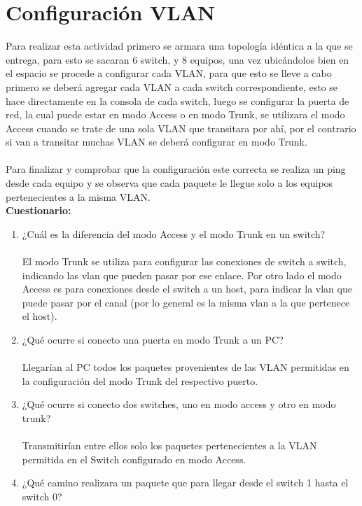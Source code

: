 \documentclass{udpreport}
\begin{document}
	\section{Configuración VLAN}
	    Para realizar esta actividad primero se armara una topología idéntica a la que se entrega, para esto se sacaran 6 switch, y 8 equipos, una vez ubicándolos bien en el espacio se procede a configurar cada VLAN, para que esto se lleve a cabo primero se deberá agregar cada VLAN a cada switch correspondiente, esto se hace directamente en la consola de cada switch, luego se configurar la puerta de red, la cual puede estar en modo Access o en modo Trunk, se utilizara el modo Access cuando se trate de una sola VLAN que transitara por ahí, por el contrario si van a transitar muchas VLAN se deberá configurar en modo Trunk.\\\\
    Para finalizar y comprobar que la configuración este correcta se realiza un ping desde cada equipo y se observa que cada
	paquete le llegue solo a los equipos pertenecientes a la misma VLAN.\\
	
	{\large \bf{Cuestionario: }}\\
	\begin{enumerate}
	    \item ¿Cuál es la diferencia del modo Access y el modo Trunk en un switch?\\\\
	         El modo Trunk se utiliza para configurar las conexiones de switch a switch, indicando las vlan que pueden pasar por ese enlace. Por otro lado el modo Access es para conexiones desde el switch a un host, para indicar la vlan que puede pasar por el canal (por lo general es la misma vlan a la que pertenece el host).
        \item  ¿Qué ocurre si conecto una puerta en modo Trunk a un PC?\\\\
            Llegarían al PC todos los paquetes provenientes de las VLAN permitidas en la configuración del modo Trunk del respectivo puerto.
        \item ¿Qué ocurre si conecto dos switches, uno en modo access y otro en modo trunk?\\\\
              Transmitirían entre ellos solo los paquetes pertenecientes a la VLAN 
  	      permitida en el Switch configurado en modo Access.
  	     \item  ¿Qué camino realizara un paquete que para llegar desde el switch 1 hasta el switch 0?\\\\
  	     
	\end{enumerate}
\end{document}

